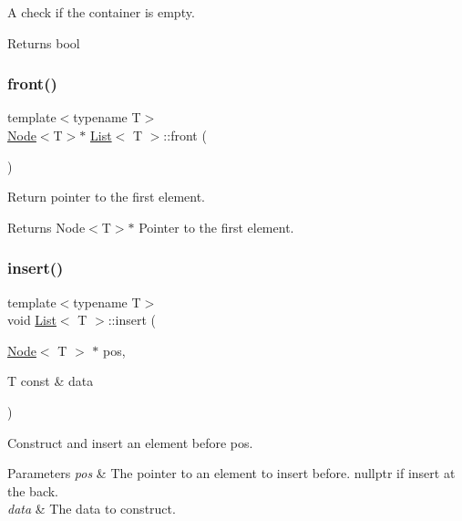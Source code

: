 A check if the container is empty. 

\begin{DoxyReturn}{Returns}
bool 
\end{DoxyReturn}
\mbox{\label{class_list_a0ea52d2f31cba662a5121ba724a1afc6}} 
\subsubsection{\texorpdfstring{front()}{front()}}
{\footnotesize\ttfamily template$<$typename T$>$ \\
\hyperlink{struct_node}{Node}$<$T$>$$\ast$ \hyperlink{class_list}{List}$<$ T $>$\+::front (\begin{DoxyParamCaption}{ }\end{DoxyParamCaption})\hspace{0.3cm}{\ttfamily [inline]}}



Return pointer to the first element. 

\begin{DoxyReturn}{Returns}
Node$<$\+T$>$$\ast$ Pointer to the first element. 
\end{DoxyReturn}
\mbox{\label{class_list_af583e46c2dad89c3f29be38a52dd27bc}} 
\subsubsection{\texorpdfstring{insert()}{insert()}\hspace{0.1cm}{\footnotesize\ttfamily [1/2]}}
{\footnotesize\ttfamily template$<$typename T$>$ \\
void \hyperlink{class_list}{List}$<$ T $>$\+::insert (\begin{DoxyParamCaption}\item[{\hyperlink{struct_node}{Node}$<$ T $>$ $\ast$}]{pos,  }\item[{T const \&}]{data }\end{DoxyParamCaption})\hspace{0.3cm}{\ttfamily [inline]}}



Construct and insert an element before pos. 


\begin{DoxyParams}{Parameters}
{\em pos} & The pointer to an element to insert before. nullptr if insert at the back. \\
\hline
{\em data} & The data to construct. \\
\hline
\end{DoxyParams}
\mbox{\label{class_list_ac7fcefb285d5b4991be548342f9b86e9}} 
